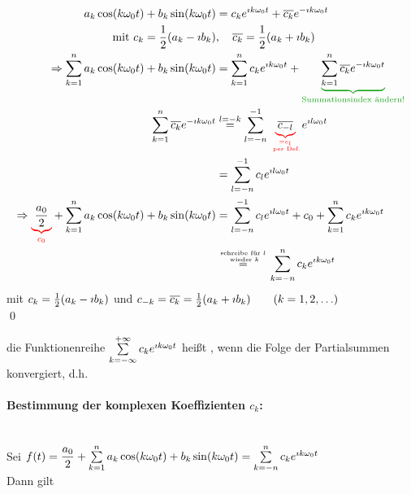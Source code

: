 \Beweis\quad
\begin{align*}
a_k\cos(k\omega_0t)+b_k\sin(k\omega_0t)&=c_ke^{\i k\omega_0t}+\ol{c_k}e^{-\i k\omega_0t}\\
\text{mit }c_k=\frac{1}{2}(a_k-\i b_k)&,\quad \ol{c_k}=\frac{1}{2}(a_k+\i b_k)\\
\Rightarrow\sum\limits_{k=1}^{n}a_k\cos(k\omega_0t)+b_k\sin(k\omega_0t)&=\sum\limits_{k=1}^{n}c_ke^{\i k\omega_0t}+\greenunderbrace{\sum\limits_{k=1}^{n}\ol{c_k}e^{-\i k\omega_0t}}{\text{Summationsindex ändern!}}\\
\sum\limits_{k=1}^{n}\ol{c_k}e^{-\i k\omega_0t}&\stackrel{l=-k}{=}\sum\limits_{l=-n}^{-1}\redunderbrace{\ol{c_{-l}}}{=c_l\atop\text{ per Def.}}e^{\i l\omega_0t}\\
&=\sum\limits_{l=-n}^{-1}c_le^{\i l\omega_0t}\\
\Rightarrow\redunderbrace{\dfrac{a_0}{2}}{c_0}+\sum\limits_{k=1}^{n}a_k\cos(k\omega_0t)+b_k\sin(k\omega_0t)&=\sum\limits_{l=-n}^{-1}c_le^{\i l\omega_0t}+c_0+\sum\limits_{k=1}^{n}c_ke^{\i k\omega_0t}\\
&\stackrel{\text{schreibe für }l\atop\text{ wieder }k}{=}\sum\limits_{k=-n}^{n}c_ke^{\i k\omega_0t}
\end{align*}
mit $c_k=\frac{1}{2}(a_k-\imath b_k)$ und $c_{-k}=\overline{c_k}=\frac{1}{2}(a_k+\imath b_k)\qquad(k=1,2,\ldots)$\\
\qed

\Def die Funktionenreihe $\sum\limits_{k=-\infty}^{+\infty}c_ke^{\imath k\omega_0t}$ heißt , wenn die Folge der Partialsummen
konvergiert, d.h.

\paragraph{Bestimmung der komplexen Koeffizienten $c_k$:}\quad\\
Sei $f(t)=\dfrac{a_0}{2}+\sum\limits_{k=1}^{n}a_k\cos(k\omega_0t)+b_k\sin(k\omega_0t)=\sum\limits_{k=-n}^{n}c_ke^{\imath k\omega_0t}$\\
Dann gilt\\
\hhspace{2cm}

